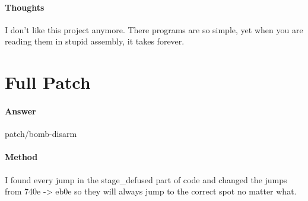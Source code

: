 \documentclass[12pt]{article}
\begin{document}
\paragraph{Thoughts}
I don't like this project anymore. There programs are so simple, yet when you are reading them in stupid assembly, it takes forever.

\section{Full Patch}
\paragraph{Answer}
patch/bomb-disarm

\paragraph{Method}
I found every jump in the stage_defused part of code and changed the jumps from 740e -> eb0e so they will always jump to the correct spot no matter what.
\end{document}
